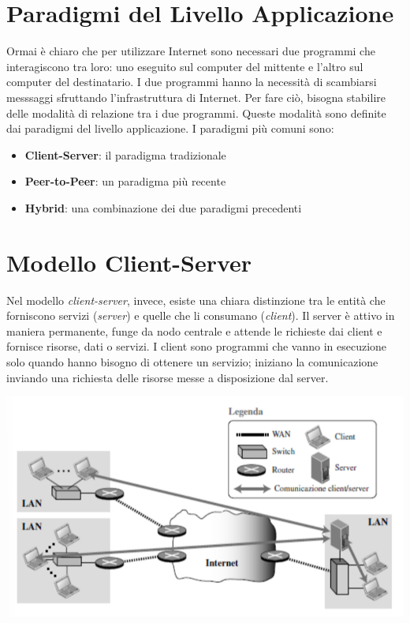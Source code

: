 \documentclass[12pt]{report}
\begin{document}
	\section{Paradigmi del Livello Applicazione}
	Ormai è chiaro che per utilizzare Internet sono necessari due programmi che interagiscono tra loro: uno eseguito sul computer del mittente e l'altro sul computer del destinatario. I due programmi hanno la necessità di scambiarsi messsaggi sfruttando l'infrastruttura di Internet. Per fare ciò, bisogna stabilire delle modalità di relazione tra i due programmi. Queste modalità sono definite dai paradigmi del livello applicazione. I paradigmi più comuni sono:
	\begin{itemize}
		\item \textbf{Client-Server}: il paradigma tradizionale
		\item \textbf{Peer-to-Peer}: un paradigma più recente
		\item \textbf{Hybrid}: una combinazione dei due paradigmi precedenti
	\end{itemize}

	\section{Modello Client-Server}
	Nel modello \textit{client-server}, invece, esiste una chiara distinzione tra le entità che forniscono servizi (\textit{server}) e quelle che li consumano (\textit{client}). 
	Il server è attivo in maniera permanente, funge da nodo centrale e attende le richieste dai client e fornisce risorse, dati o servizi. I client sono programmi che vanno in esecuzione solo quando hanno bisogno di ottenere un servizio; iniziano la comunicazione inviando una richiesta delle risorse messe a disposizione dal server.
	\begin{center}
		\includegraphics[scale=0.5]{assets/client-server.png}
	\end{center}
\end{document}
